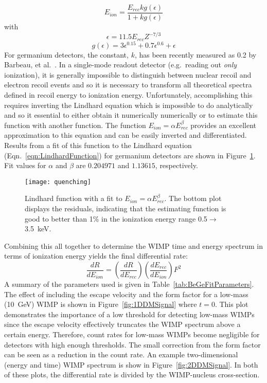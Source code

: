 		\begin{equation}
			E_{ion} =  \frac{E_{rec} k g(\epsilon)}{1 + k g(\epsilon)}
			\label{eqn:LindhardFunction}
		\end{equation}
with 
		\[
			\epsilon =  11.5 E_{rec} Z^{-7/3}
		\]
		\[
			g(\epsilon) = 3 \epsilon^{0.15} + 0.7\epsilon^{0.6} + \epsilon
		\]
For germanium detectors, the constant, $k$, has been recently measured as 0.2 by Barbeau, et al.~\cite{Barbeau:2009fk}.  In a single-mode readout detector (e.g.~reading out \emph{only} ionization), it is generally impossible to distinguish between nuclear recoil and electron recoil events and so it is necessary to transform all theoretical spectra defined in recoil energy to ionization energy.  Unfortunately, accomplishing this requires inverting the Lindhard equation which is impossible to do analytically and so it essential to either obtain it numerically numerically or to estimate this function with another function.  The function $E_{ion} =  \alpha E_{rec}^{\beta}$ provides an excellent approximation to this equation and can be easily inverted and differentiated.  Results from a fit of this function to the Lindhard equation (Eqn.~\ref{eqn:LindhardFunction}) for germanium detectors are shown in Figure~\ref{fig:LindhardFitResults}.  Fit values for $\alpha$ and $\beta$ are $0.204971$ and $1.13615$, respectively.

		\begin{figure}
			\centering
			\texttt{[image: quenching]}
			\caption{Lindhard function with a fit to $E_{ion} =  \alpha E_{rec}^{\beta}$.  
			The bottom plot displays the residuals, 
			indicating that the estimating function is good to better than 1\% in the 
			ionization energy range 0.5$\to$3.5~keV.}
			\label{fig:LindhardFitResults}
		\end{figure}
Combining this all together to determine the WIMP time and energy spectrum in terms of ionization energy yields the final differential rate:
		\begin{equation}
				\frac{dR}{dE_{ion}}  = \left(\frac{dR}{dE_{rec}} \right) \left(\frac{dE_{rec}}{dE_{ion}} \right) F^{2}
			\label{eqn:FinalFitSpectrum}
		\end{equation}	
A summary of the parameters used is given in Table~\ref{tab:BeGeFitParameters}.  The effect of including the escape velocity and the form factor for a low-mass (10~GeV) WIMP is shown in Figure~\ref{fig:1DDMSignal} where $t=0$.  This plot demonstrates the importance of a low threshold for detecting low-mass WIMPs since the escape velocity effectively truncates the WIMP spectrum above a certain energy.  Therefore, count rates for low-mass WIMPs become negligible for detectors with high enough thresholds.  The small correction from the form factor can be seen as a reduction in the count rate.  An example two-dimensional (energy and time) WIMP spectrum is show in Figure~\ref{fig:2DDMSignal}.  In both of these plots, the differential rate is divided by the WIMP-nucleus cross-section.

